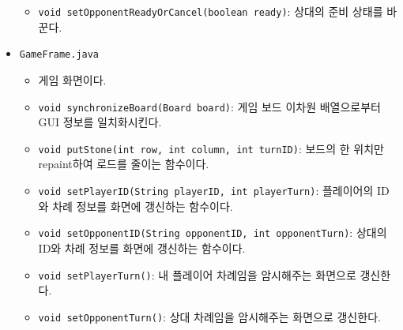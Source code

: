 \documentclass[a4paper, 10pt]{article}
\begin{document}
\begin{itemize}
\begin{itemize}
    \item \texttt{void setOpponentReadyOrCancel(boolean ready)}: 상대의 준비 상태를 바꾼다.
  \end{itemize}
  \item \texttt{GameFrame.java}
  \begin{itemize}
    \item[] 게임 화면이다.
    \item \texttt{void synchronizeBoard(Board board)}: 게임 보드 이차원 배열으로부터 GUI 정보를 일치화시킨다.
    \item \texttt{void putStone(int row, int column, int turnID)}: 보드의 한 위치만 repaint하여 로드를 줄이는 함수이다.
    \item \texttt{void setPlayerID(String playerID, int playerTurn)}: 플레이어의 ID와 차례 정보를 화면에 갱신하는 함수이다.
    \item \texttt{void setOpponentID(String opponentID, int opponentTurn)}: 상대의 ID와 차례 정보를 화면에 갱신하는 함수이다.
    \item \texttt{void setPlayerTurn()}: 내 플레이어 차례임을 암시해주는 화면으로 갱신한다.
    \item \texttt{void setOpponentTurn()}: 상대 차례임을 암시해주는 화면으로 갱신한다.
  \end{itemize}
\end{itemize}
\end{document}
